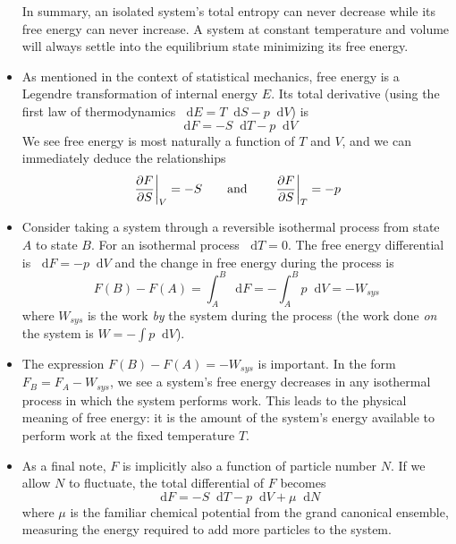 \documentclass[11pt, a4paper]{article}
\newcommand{\diff}{\mathop{}\!\mathrm{d}} %
\begin{document}
\begin{itemize}
	In summary, an isolated system's total entropy can never decrease while its free energy can never increase. A system at constant temperature and volume will always settle into the equilibrium state minimizing its free energy.
	
	\item As mentioned in the context of statistical mechanics, free energy is a Legendre transformation of internal energy $ E $. Its total derivative (using the first law of thermodynamics $ \diff E = T \diff S - p \diff V $) is
	\begin{equation*}
		\diff F  = - S \diff T - p \diff V 
	\end{equation*}
	We see free energy is most naturally a function of $ T $ and $ V $, and we can immediately deduce the relationships
	\begin{equation*}
		\eval{\pdv{F}{S}}_{V} = - S \qquad \text{and} \qquad 	\eval{\pdv{F}{S}}_{T} = - p
	\end{equation*}
	
	\item Consider taking a system through a reversible isothermal process from state $ A $ to state $ B $. For an isothermal process $ \diff T = 0 $. The free energy differential is $ \diff F = - p \diff V $ and the change in free energy during the process is
	\begin{equation*}
		F(B) - F(A) = \int_{A}^{B} \diff F = - \int_{A}^{B} p \diff V = -W_{sys}
	\end{equation*}
	where $ W_{sys} $ is the work \textit{by} the system during the process (the work done \textit{on} the system is $ W = -\int p \diff V$).
	
	\item The expression $ F(B) - F(A) = -W_{sys} $ is important. In the form $ F_{B} = F_{A} - W_{sys} $, we see a system's free energy decreases in any isothermal process in which the system performs work. This leads to the physical meaning of free energy: it is the amount of the system's energy available to perform work at the fixed temperature $ T $.
	
	\item As a final note, $ F $ is implicitly also a function of particle number $ N $. If we allow $ N $ to fluctuate, the total differential of $ F $ becomes
	\begin{equation*}
		\diff F  = - S \diff T - p \diff V + \mu \diff N
	\end{equation*}
	where $ \mu $ is the familiar chemical potential from the grand canonical ensemble, measuring the energy required to add more particles to the system.
\end{itemize}
\end{document}
